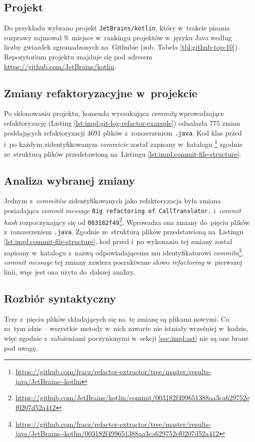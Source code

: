 \documentclass[twoside]{praca}
\begin{document}
\subsection{Projekt}
Do przykładu wybrano projekt \texttt{JetBrains/kotlin}, który w~trakcie pisania rozprawy zajmował 9. miejsce w~rankingu projektów w~języku Java według liczby gwiazdek zgromadzonych na~Githubie (zob. Tabela \ref{tbl:github-top-10}). Repozytorium projektu znajduje się pod adresem \url{https://github.com/JetBrains/kotlin}. 

\subsection{Zmiany refaktoryzacyjne w~projekcie}
Po sklonowaniu projektu, komenda wyszukująca \textit{commity} wprowadzające refaktoryzację (Listing \ref{lst:impl:git-log-refactor-example}) odnalazła 775 zmian poddających refaktoryzacji 4691 plików z~rozszerzeniem \texttt{.java}. Kod klas przed i~po każdym zidentyfikowanym \textit{commicie} został zapisany w~katalogu \footnote{\url{https://github.com/fracz/refactor-extractor/tree/master/results-java/JetBrains--kotlin}} zgodnie ze~strukturą plików przedstawioną na~Listingu \ref{lst:impl:commit-file-structure}.

\subsection{Analiza wybranej zmiany}
Jednym z~\textit{commitów} zidentyfikowanych jako refaktoryzacja była zmiana posiadająca \textit{commit message} \texttt{Big refactoring of CallTranslator.} i~\textit{commit hash} rozpoczynający się od \texttt{003182f49}\footnote{\url{https://github.com/JetBrains/kotlin/commit/003182f499651388aa3ca629752ef0207d52a412}}. Wprowadza ona zmiany do~pięciu plików z~rozszerzeniem \texttt{.java}. Zgodnie ze~strukturą plików przedstawioną na~Listingu \ref{lst:impl:commit-file-structure}, kod przed i~po wykonaniu tej zmiany został zapisany w~katalogu z~nazwą odpowiadającemu mu identyfikatorowi \textit{commita}\footnote{\url{https://github.com/fracz/refactor-extractor/tree/master/results-java/JetBrains--kotlin/003182f499651388aa3ca629752ef0207d52a412}}. \textit{commit message} tej zmiany zawiera poszukiwane słowo \textit{refactoring} w~pierwszej linii, więc jest ona użyta do~dalszej analizy.

\subsection{Rozbiór syntaktyczny}
Trzy z~pięciu plików składających się na~tę zmianę są plikami nowymi. Co za~tym idzie -- wszystkie metody w~nich zawarte nie istniały wcześniej w~kodzie, więc zgodnie z~założeniami poczynionymi w~sekcji \ref{sec:impl:ast} nie są one brane pod uwagę.
\end{document}
